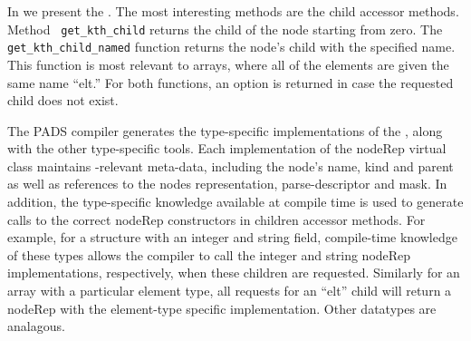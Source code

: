 In  we present the \padx{} \absdm.  The most
interesting methods are the child accessor methods. Method {\tt
  get\_kth\_child} returns the  child of the node starting from
zero. The {\tt get\_kth\_child\_named} function returns the node's
 child with the specified name. This function is most relevant
to arrays, where all of the elements are given the same name ``elt.''
For both functions, an option is returned in case the requested child
does not exist.

The PADS compiler generates the type-specific implementations of the
\padx \absdm, along with the other type-specific tools.  Each
implementation of the nodeRep virtual class maintains \xml{}-relevant
meta-data, including the node's name, kind and parent as well as
references to the nodes representation, parse-descriptor and mask.  In
addition, the type-specific knowledge available at compile time is
used to generate calls to the correct nodeRep constructors in children
accessor methods.  For example, for a structure with an integer and
string field, compile-time knowledge of these types allows the
compiler to call the integer and string nodeRep implementations,
respectively, when these children are requested. Similarly for an
array with a particular element type, all requests for an ``elt''
child will return a nodeRep with the element-type specific
implementation. Other datatypes are analagous.





